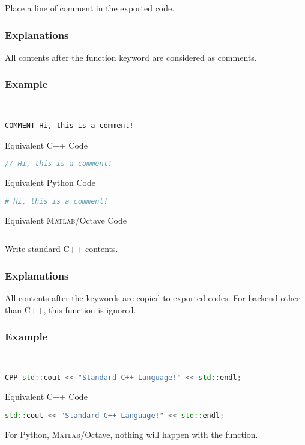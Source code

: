 Place a line of comment in the exported code.
\subsubsection*{Explanations}
All contents after the function keyword  are considered as comments.
\subsubsection*{Example}
\begin{example}~
  \begin{lstlisting}[language=mmcesim-sim]
COMMENT Hi, this is a comment!
  \end{lstlisting}
  Equivalent C++ Code
  \begin{lstlisting}[language=c++]
// Hi, this is a comment!
  \end{lstlisting}
  Equivalent Python Code
  \begin{lstlisting}[language=python]
# Hi, this is a comment!
  \end{lstlisting}
  Equivalent \textsc{Matlab}/Octave Code
  \begin{lstlisting}[language=matlab]
% Hi, this is a comment!
  \end{lstlisting}
\end{example}

Write standard C++ contents.
\subsubsection*{Explanations}
All contents after the  keywords are copied to exported codes.
For backend other than C++, this function is ignored.
\subsubsection*{Example}
\begin{example}~
  \begin{lstlisting}[language=c++, morekeywords={CPP}]
CPP std::cout << "Standard C++ Language!" << std::endl;
  \end{lstlisting}
  Equivalent C++ Code
  \begin{lstlisting}[language=c++]
std::cout << "Standard C++ Language!" << std::endl;
  \end{lstlisting}
  For Python, \textsc{Matlab}/Octave, nothing will happen with the  function.
\end{example}

